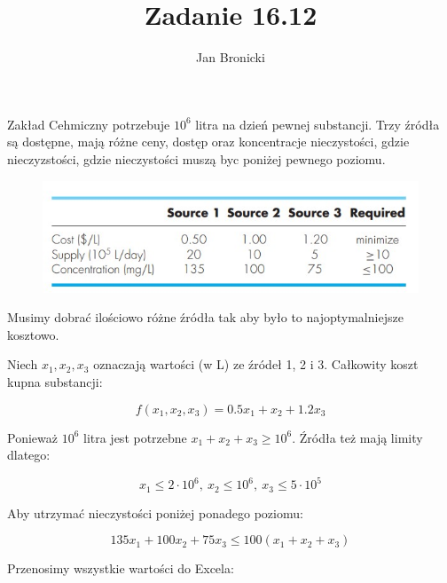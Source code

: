 \documentclass{article}
\title{Zadanie 16.12}
\author{Jan Bronicki}
\date{}
\begin{document}
\maketitle


Zakład Cehmiczny potrzebuje $10^{6}$ litra na dzień pewnej substancji. Trzy źródła są dostępne, mają różne ceny, dostęp oraz koncentracje nieczystości, gdzie nieczyzstości, gdzie nieczystości muszą byc poniżej pewnego poziomu.


\begin{figure}[h!]
    \centering
    \includegraphics[scale=0.75]{sources.jpg}
\end{figure}


Musimy dobrać ilościowo różne źródła tak aby było to najoptymalniejsze kosztowo.

Niech $x_{1}, x_{2}, x_{3}$ oznaczają wartości (w L) ze źródeł 1, 2 i 3. Całkowity koszt kupna substancji:

$$
    f(x_{1}, x_{2}, x_{3})=0.5x_{1} + x_{2} + 1.2x_{3}
$$

Ponieważ $10^{6}$ litra jest potrzebne $x_{1} + x_{2} + x_{3} \geq 10^{6}$. Źródła też mają limity dlatego:

$$
    x_{1} \leq 2\cdot 10^{6}, \ x_{2} \leq 10^{6}, \ x_{3} \leq 5\cdot 10^{5}
$$

Aby utrzymać nieczystości poniżej ponadego poziomu:

$$
    135x_{1}+100x_{2}+75x_{3} \leq 100(x_{1}+x_{2}+x_{3})
$$


Przenosimy wszystkie wartości do Excela:
\end{document}
